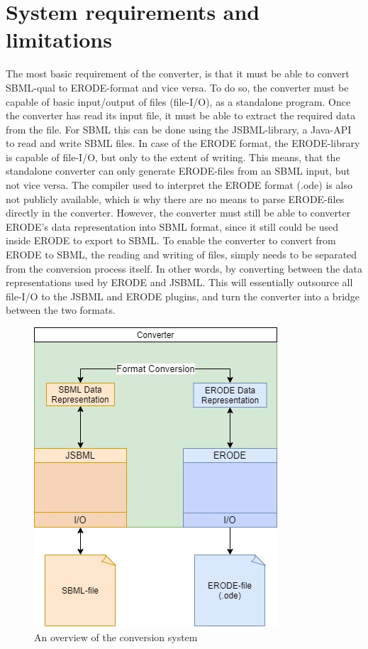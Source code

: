 \section{System requirements and limitations}
The most basic requirement of the converter, is that it must be able to convert SBML-qual to ERODE-format and vice versa. To do so, the converter must be capable of basic input/output of files (file-I/O), as a standalone program. Once the converter has read its input file, it must be able to extract the required data from the file. For SBML this can be done using the JSBML-library, a Java-API to read and write SBML files. In case of the ERODE format, the ERODE-library is capable of file-I/O, but only to the extent of writing. This means, that the standalone converter can only generate ERODE-files from an SBML input, but not vice versa. The compiler used to interpret the ERODE format (.ode) is also not publicly available, which is why there are no means to parse ERODE-files directly in the converter.
However, the converter must still be able to converter ERODE's data representation into SBML format, since it still could be used inside ERODE to export to SBML. To enable the converter to convert from ERODE to SBML, the reading and writing of files, simply needs to be separated from the conversion process itself. In other words, by converting between the data representations used by ERODE and JSBML. This will essentially outsource all file-I/O to the JSBML and ERODE plugins, and turn the converter into a bridge between the two formats. 

\begin{figure}[H]
    \centering
    \includegraphics[scale=0.45]{Sections/Images/ConverterSystem.jpg}
    \caption{An overview of the conversion system}
    \label{fig:converter_overview}
\end{figure}

